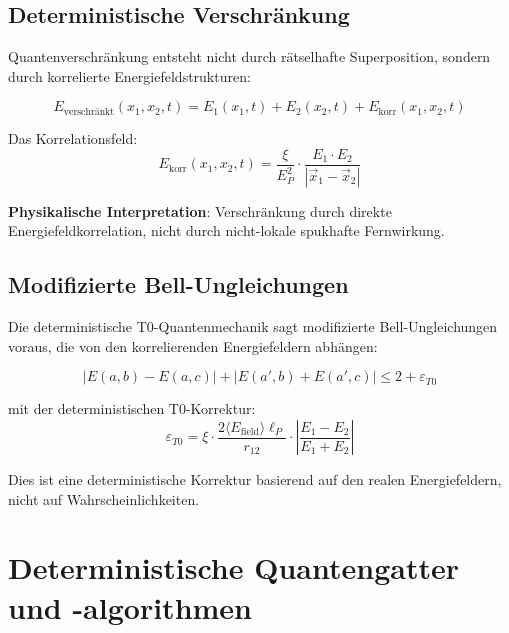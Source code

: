 \documentclass[12pt,a4paper]{article}
\newcommand{\xipar}{\xi}
\newcommand{\EPlanck}{E_P}
\theoremstyle{definition}
\theoremstyle{remark}
\begin{document}
\subsection{Deterministische Verschr{\"a}nkung}

Quantenverschr{\"a}nkung entsteht nicht durch r{\"a}tselhafte Superposition, sondern durch korrelierte Energiefeldstrukturen:

\begin{equation}
	E_{\text{verschr{\"a}nkt}}(x_1, x_2, t) = E_1(x_1, t) + E_2(x_2, t) + E_{\text{korr}}(x_1, x_2, t)
	\label{eq:deterministic_entanglement}
\end{equation}

Das Korrelationsfeld:
\begin{equation}
	E_{\text{korr}}(x_1, x_2, t) = \frac{\xipar}{\EPlanck^2} \cdot \frac{E_1 \cdot E_2}{|\vec{x}_1 - \vec{x}_2|}
	\label{eq:correlation_field}
\end{equation}

\textbf{Physikalische Interpretation}: Verschr{\"a}nkung durch direkte Energiefeldkorrelation, nicht durch nicht-lokale spukhafte Fernwirkung.

\subsection{Modifizierte Bell-Ungleichungen}

Die deterministische T0-Quantenmechanik sagt modifizierte Bell-Ungleichungen voraus, die von den korrelierenden Energiefeldern abh{\"a}ngen:

\begin{equation}
	\boxed{|E(a,b) - E(a,c)| + |E(a',b) + E(a',c)| \leq 2 + \varepsilon_{T0}}
	\label{eq:modified_bell_deterministic}
\end{equation}

mit der deterministischen T0-Korrektur:
\begin{equation}
	\varepsilon_{T0} = \xipar \cdot \frac{2\langle E_{\text{field}} \rangle \ell_P}{r_{12}} \cdot \left|\frac{E_1 - E_2}{E_1 + E_2}\right|
	\label{eq:deterministic_bell_correction}
\end{equation}

Dies ist eine deterministische Korrektur basierend auf den realen Energiefeldern, nicht auf Wahrscheinlichkeiten.

\section{Deterministische Quantengatter und -algorithmen}
\end{document}
